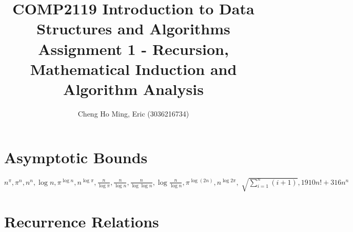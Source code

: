 \documentclass{article}
\title{COMP2119 Introduction to Data Structures and Algorithms
Assignment 1 - Recursion, Mathematical Induction and Algorithm Analysis}
\author{Cheng Ho Ming, Eric (3036216734)}
\begin{document}
\maketitle

\section{Asymptotic Bounds}

$n^\pi, \pi^n, n^n,{\log n}, \pi ^ {\log n}, n^{\log \pi}, \frac{n}{\log\pi}, \frac{n}{\log n}, \frac{n}{\log {\log n}}, {\log {\frac{n}{\log n}}},
\pi ^ {\log (2n)}, n^{\log{2\pi}}, \sqrt[]{\sum_{i=1}^{n} (i+1)}, 1910n! + 316n^n$

\section{Recurrence Relations}
\end{document}
